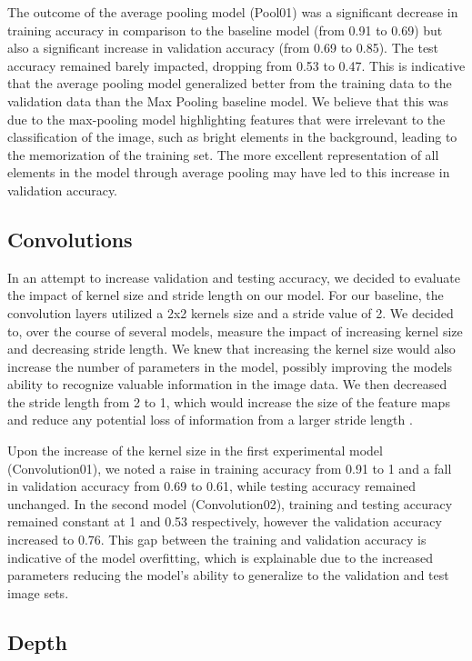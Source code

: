 \documentclass{article}
\begin{document}
The outcome of the average pooling model (Pool01) was a significant decrease in training accuracy in comparison to the baseline model (from 0.91 to 0.69) but also a significant increase in validation accuracy (from 0.69 to 0.85). The test accuracy remained barely impacted, dropping from 0.53 to 0.47. This is indicative that the average pooling model generalized better from the training data to the validation data than the Max Pooling baseline model. We believe that this was due to the max-pooling model highlighting features that were irrelevant to the classification of the image, such as bright elements in the background, leading to the memorization of the training set. The more excellent representation of all elements in the model through average pooling may have led to this increase in validation accuracy.

\subsection{Convolutions}

In an attempt to increase validation and testing accuracy, we decided to evaluate the impact of kernel size and stride length on our model. For our baseline, the convolution layers utilized a 2x2 kernels size and a stride value of 2. We decided to, over the course of several models, measure the impact of increasing kernel size and decreasing stride length. We knew that increasing the kernel size would also increase the number of parameters in the model, possibly improving the models ability to recognize valuable information in the image data. We then decreased the stride length from 2 to 1, which would increase the size of the feature maps and reduce any potential loss of information from a larger stride length \cite{Goodfellow-et-al-2016}.

Upon the increase of the kernel size in the first experimental model (Convolution01), we noted a raise in training accuracy from 0.91 to 1 and a fall in validation accuracy from 0.69 to 0.61, while testing accuracy remained unchanged. In the second model (Convolution02), training and testing accuracy remained constant at 1 and 0.53 respectively, however the validation accuracy increased to 0.76. This gap between the training and validation accuracy is indicative of the model overfitting, which is explainable due to the increased parameters reducing the model's ability to generalize to the validation and test image sets.

\subsection{Depth}
\end{document}
